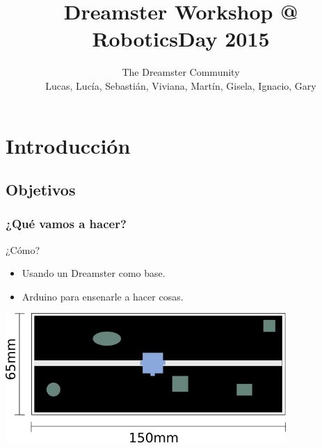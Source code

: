 \documentclass[compress]{beamer}
\title[Dreamster Workshop]{Dreamster Workshop @ RoboticsDay 2015}
\author[Robotics Day]
{
The Dreamster Community \\
Lucas, Lucía, Sebastián, Viviana, Martín, Gisela, Ignacio, Gary
}
\begin{document}
\frame{\titlepage}

\section{Introducción}
\subsection{Objetivos}

\begin{frame}
 \frametitle{¿Qué vamos a hacer?}

\begin{center}
\end{center}

\begin{block}{¿Cómo?}
\begin{itemize}
 \item Usando un Dreamster como base.
 \item Arduino para ensenarle a hacer cosas.
\end{itemize}
\end{block}

\begin{center}
\includegraphics[width=0.8\textwidth]{./img/desk.png} 
\end{center}

\end{frame}
 
\end{document}
